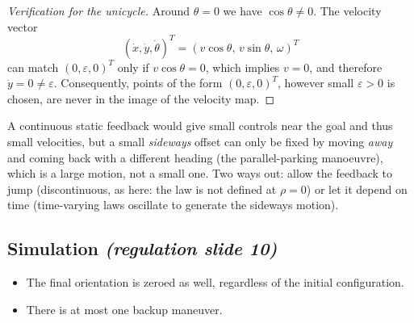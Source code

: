 \documentclass[11pt,a4paper]{article}
\theoremstyle{definition}
\theoremstyle{plain}
\theoremstyle{remark}
\begin{document}
\begin{proof}[Verification for the unicycle]
Around $\theta=0$ we have $\cos\theta\neq0$. The velocity vector
\[
(\dot x,\dot y,\dot\theta)^T = (v\cos\theta,\, v\sin\theta,\, \omega)^T
\]
can match $(0,\varepsilon,0)^T$ only if $v\cos\theta=0$, which implies $v=0$, and therefore $\dot y=0\ne\varepsilon$. Consequently, points of the form $(0,\varepsilon,0)^T$, however small $\varepsilon>0$ is chosen, are never in the image of the velocity map.
\end{proof}

\begin{intuition}
A continuous static feedback would give small controls near the goal and thus small velocities, but a small \emph{sideways} offset can only be fixed by moving \emph{away} and coming back with a different heading (the parallel-parking manoeuvre), which is a large motion, not a small one. Two ways out: allow the feedback to jump (discontinuous, as here: the law is not defined at $\rho=0$) or let it depend on time (time-varying laws oscillate to generate the sideways motion).
\end{intuition}

\subsection{Simulation \emph{(regulation slide 10)}}

\begin{itemize}[leftmargin=*,nosep]
\item The final orientation is zeroed as well, regardless of the initial configuration.
\item There is at most one backup maneuver.
\end{itemize}
\end{document}
